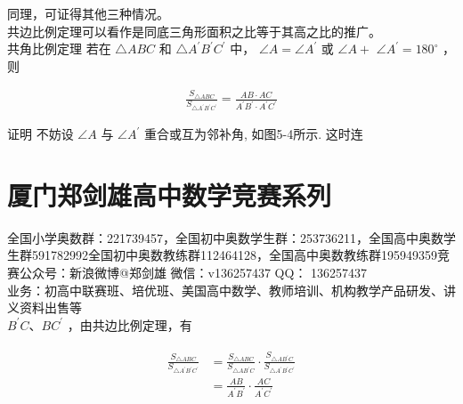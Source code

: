 \documentclass[10pt]{article}
\begin{document}
同理，可证得其他三种情况。\\
共边比例定理可以看作是同底三角形面积之比等于其高之比的推广。\\
共角比例定理 若在 $\triangle A B C$ 和 $\triangle A^{\prime} B^{\prime} C^{\prime}$ 中， $\angle A=\angle A^{\prime}$ 或 $\angle A+$ $\angle A^{\prime}=180^{\circ}$ ，则

\begin{align*}
\frac{S_{\triangle A B C}}{S_{\triangle A^{\prime} B^{\prime} C^{\prime}}}=\frac{A B \cdot A C}{A^{\prime} B^{\prime} \cdot A^{\prime} C^{\prime}} \tag{5-6}
\end{align*}

证明 不妨设 $\angle A$ 与 $\angle A^{\prime}$ 重合或互为邻补角, 如图5-4所示. 这时连

\section*{厦门郑剑雄高中数学竞赛系列}
全国小学奥数群：221739457，全国初中奥数学生群：253736211，全国高中奥数学生群591782992全国初中奥数教练群112464128，全国高中奥数教练群195949359竞赛公众号：新浪微博@郑剑雄 微信：v136257437 QQ： 136257437\\
业务：初高中联赛班、培优班、美国高中数学、教师培训、机构教学产品研发、讲义资料出售等\\
$B^{\prime} C 、 B C^{\prime}$ ，由共边比例定理，有

\begin{align*}
\begin{aligned}
\frac{S_{\triangle A B C}}{S_{\triangle A^{\prime} B^{\prime} C^{\prime}}} & =\frac{S_{\triangle A B C}}{S_{\triangle A B^{\prime} C}} \cdot \frac{S_{\triangle A B^{\prime} C}}{S_{\triangle A^{\prime} B^{\prime} C^{\prime}}} \\
& =\frac{A B}{A^{\prime} B^{\prime}} \cdot \frac{A C}{A^{\prime} C^{\prime}}
\end{aligned}
\end{align*}
\end{document}
